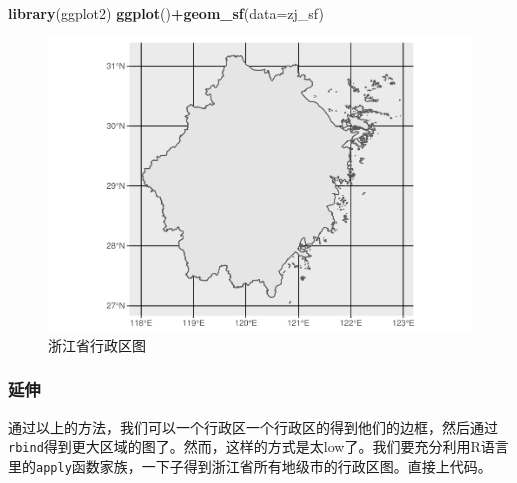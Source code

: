 \documentclass[]{article}
\newenvironment{Shaded}{\begin{snugshade}}{\end{snugshade}}
\newcommand{\DataTypeTok}[1]{\textcolor[rgb]{0.13,0.29,0.53}{#1}}
\newcommand{\KeywordTok}[1]{\textcolor[rgb]{0.13,0.29,0.53}{\textbf{#1}}}
\newcommand{\NormalTok}[1]{#1}
\newcommand{\OperatorTok}[1]{\textcolor[rgb]{0.81,0.36,0.00}{\textbf{#1}}}
\begin{document}
\begin{Shaded}
\begin{Highlighting}[]
\KeywordTok{library}\NormalTok{(ggplot2)}
\KeywordTok{ggplot}\NormalTok{()}\OperatorTok{+}\KeywordTok{geom_sf}\NormalTok{(}\DataTypeTok{data=}\NormalTok{zj_sf)}
\end{Highlighting}
\end{Shaded}

\begin{figure}

{\centering \includegraphics{get_border_files/figure-latex/ggplot_zj-1} 

}

\caption{浙江省行政区图}\label{fig:ggplot_zj}
\end{figure}

\subsubsection{延伸}

通过以上的方法，我们可以一个行政区一个行政区的得到他们的边框，然后通过\texttt{rbind}得到更大区域的图了。然而，这样的方式是太low了。我们要充分利用R语言里的\texttt{apply}函数家族，一下子得到浙江省所有地级市的行政区图。直接上代码。
\end{document}
